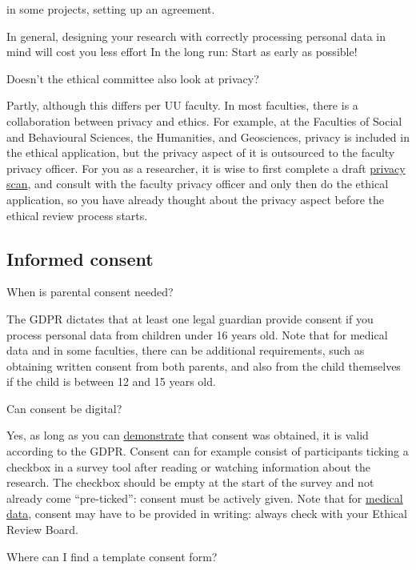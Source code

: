\documentclass[
]{book}
\begin{document}
in some projects, setting up an agreement.

In general, designing your research with correctly processing personal data in mind will cost you less effort In the long run: Start as early as possible!

Doesn't the ethical committee also look at privacy?

Partly, although this differs per UU faculty. In most faculties, there is a collaboration between privacy and ethics. For example, at the Faculties of Social and Behavioural Sciences, the Humanities, and Geosciences, privacy is included in the ethical application, but the privacy aspect of it is outsourced to the faculty privacy officer. For you as a researcher, it is wise to first complete a draft \protect\hyperlink{privacy-scan}{privacy scan}, and consult with the faculty privacy officer and only then do the ethical application, so you have already thought about the privacy aspect before the ethical review process starts.

\hypertarget{consent}{%
\subsection{Informed consent}\label{consent}}

When is parental consent needed?

The GDPR dictates that at least one legal guardian provide consent if you process personal data from children under 16 years old. Note that for medical data and in some faculties, there can be additional requirements, such as obtaining written consent from both parents, and also from the child themselves if the child is between 12 and 15 years old.

Can consent be digital?

Yes, as long as you can \protect\hyperlink{forms-consent}{demonstrate} that consent was obtained, it is valid according to the GDPR. Consent can for example consist of participants ticking a checkbox in a survey tool after reading or watching information about the research. The checkbox should be empty at the start of the survey and not already come ``pre-ticked'': consent must be actively given. Note that for \href{https://www.ccmo.nl/onderzoekers/wet-en-regelgeving-voor-medisch-wetenschappelijk-onderzoek/de-wmo-in-een-notendop/toestemming/elektronische-toestemming}{medical data}, consent may have to be provided in writing: always check with your Ethical Review Board.

Where can I find a template consent form?~~~
\end{document}
